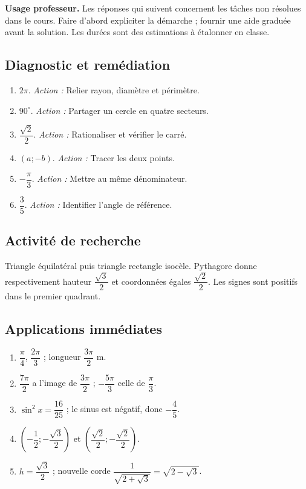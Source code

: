 \label{C10-CORR}
\textbf{Usage professeur.} Les réponses qui suivent concernent les tâches non résolues dans le cours. Faire d’abord expliciter la démarche ; fournir une aide graduée avant la solution. Les durées sont des estimations à étalonner en classe.
\subsection*{Diagnostic et remédiation}
\begin{enumerate}
\item $2\pi$. \textit{Action :} Relier rayon, diamètre et périmètre.
\item $90^\circ$. \textit{Action :} Partager un cercle en quatre secteurs.
\item $\dfrac{\sqrt 2}{2}$. \textit{Action :} Rationaliser et vérifier le carré.
\item $(a;-b)$. \textit{Action :} Tracer les deux points.
\item $-\dfrac{\pi}{3}$. \textit{Action :} Mettre au même dénominateur.
\item $\dfrac{3}{5}$. \textit{Action :} Identifier l’angle de référence.
\end{enumerate}
\subsection*{Activité de recherche}
Triangle équilatéral puis triangle rectangle isocèle. Pythagore donne respectivement hauteur $\dfrac{\sqrt 3}{2}$ et coordonnées égales $\dfrac{\sqrt 2}{2}$. Les signes sont positifs dans le premier quadrant.
\subsection*{Applications immédiates}
\begin{enumerate}
\item $\dfrac{\pi}{4}$, $\dfrac{2\pi}{3}$ ; longueur $\dfrac{3\pi}{2}$ m.
\item $\dfrac{7\pi}{2}$ a l’image de $\dfrac{3\pi}{2}$ ; $-\dfrac{5\pi}{3}$ celle de $\dfrac{\pi}{3}$.
\item $\sin ^2x=\dfrac{16}{25}$ ; le sinus est négatif, donc $-\dfrac{4}{5}$.
\item $(-\dfrac{1}{2};-\dfrac{\sqrt 3}{2})$ et $(\dfrac{\sqrt 2}{2};-\dfrac{\sqrt 2}{2})$.
\item $h=\dfrac{\sqrt 3}{2}$ ; nouvelle corde $\dfrac{1}{\sqrt {2+\sqrt3}}=\sqrt {2-\sqrt3}$.
\end{enumerate}
